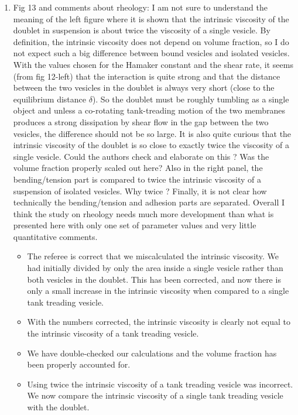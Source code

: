 \documentclass[11pt]{article}
\newcommand{\comment}[1]{{\color{blue} #1}}
\begin{document}
\begin{enumerate}
\item\comment{Fig 13 and comments about rheology: I am not sure to understand
the meaning of the left figure where it is shown that the intrinsic
viscosity of the doublet in suspension is about twice the viscosity of a
single vesicle. By definition, the intrinsic viscosity does not depend
on volume fraction, so I do not expect such a big difference between
bound vesicles and isolated vesicles. With the values chosen for the
Hamaker constant and the shear rate, it seems (from fig 12-left) that
the interaction is quite strong and that the distance between the two
vesicles in the doublet is always very short (close to the equilibrium
distance $\delta$). So the doublet must be roughly tumbling as a single
object and unless a co-rotating tank-treading motion of the two
membranes produces a strong dissipation by shear flow in the gap between
the two vesicles, the difference should not be so large. It is also
quite curious that the intrinsic viscosity of the doublet is so close to
exactly twice the viscosity of a single vesicle. Could the authors check
and elaborate on this ? Was the volume fraction properly scaled out
here? Also in the right panel, the bending/tension part is compared to
twice the intrinsic viscosity of a suspension of isolated vesicles. Why
twice ? Finally, it is not clear how technically the bending/tension and
adhesion parts are separated.  Overall I think the study on rheology
needs much more development than what is presented here with only one
set of parameter values and very little quantitative comments.}
\begin{itemize}
  \item The referee is correct that we miscalculated the intrinsic
    viscosity.  We had initially divided by only the area inside a
    single vesicle rather than both vesicles in the doublet.  This has
    been corrected, and now there is only a small increase in the
    intrinsic viscosity when compared to a single tank treading vesicle.

  \item With the numbers corrected, the intrinsic viscosity is clearly
    not equal to the intrinsic viscosity of a tank treading vesicle.

  \item We have double-checked our calculations and the volume fraction
    has been properly accounted for.

  \item Using twice the intrinsic viscosity of a tank treading vesicle
    was incorrect.  We now compare the intrinsic viscosity of a single
    tank treading vesicle with the doublet.


\end{itemize}
\end{enumerate}
\end{document}
